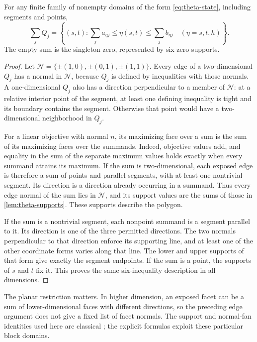 \begin{lemma}\label{lem:theta-minkowski}
For any finite family of nonempty domains of the form
\eqref{eq:theta-state}, including segments and points,
\begin{equation}\label{eq:theta-minkowski}
 \sum_jQ_j=
 \left\{(s,t):\sum_j a_{\eta j}\le\eta(s,t)
                    \le\sum_j b_{\eta j}\quad(\eta=s,t,h)\right\}.
\end{equation}
The empty sum is the singleton zero, represented by six zero supports.
\end{lemma}
\begin{proof}
Let $\mathcal N=\{\pm(1,0),\pm(0,1),\pm(1,1)\}$. Every edge of a
two-dimensional $Q_j$ has a normal in $\mathcal N$, because $Q_j$ is
defined by inequalities with those normals. A one-dimensional $Q_j$
also has a direction perpendicular to a member of $\mathcal N$: at a
relative interior point of the segment, at least one defining inequality
is tight and its boundary contains the segment. Otherwise that point
would have a two-dimensional neighborhood in $Q_j$.

For a linear objective with normal $n$, its maximizing face over a sum
is the sum of its maximizing faces over the summands. Indeed, objective
values add, and equality in the sum of the separate maximum values holds
exactly when every summand attains its maximum. If the sum is
two-dimensional, each exposed edge is therefore a sum of points and
parallel segments, with at least one nontrivial segment. Its direction
is a direction already occurring in a summand. Thus every edge normal of
the sum lies in $\mathcal N$, and its support values are the sums of
those in \cref{lem:theta-supports}. These supports describe the polygon.

If the sum is a nontrivial segment, each nonpoint summand is a segment
parallel to it. Its direction is one of the three permitted directions.
The two normals perpendicular to that direction enforce its supporting
line, and at least one of the other coordinate forms varies along that
line. The lower and upper supports of that form give exactly the segment
endpoints. If the sum is a point, the supports of $s$ and $t$ fix it.
This proves the same six-inequality description in all dimensions.
\end{proof}

The planar restriction matters. In higher dimension, an exposed facet
can be a sum of lower-dimensional faces with different directions, so the
preceding edge argument does not give a fixed list of facet normals.
The support and normal-fan identities used here are classical
\citep{GritzmannSturmfels1993}; the explicit formulas exploit these
particular block domains.


